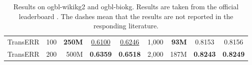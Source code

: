 \documentclass[10pt, a4paper]{article}
\begin{document}
\begin{table}[!htb]
{\begin{tabular}{ccrcccrcc}
			TransERR  & 100                                       & \textbf{250M}                                 & \underline{0.6100} & \underline{0.6246} & 1,000  & \textbf{93M}   & 0.8153             & 0.8156             \\
			TransERR  & 200                                       & 500M                                 & \textbf{0.6359}    & \textbf{0.6518}    & 2,000  & 187M  & \textbf{0.8243}    & \textbf{0.8249}    \\ \hline
		\end{tabular}}
	\caption{Results on ogbl-wikikg2 and ogbl-biokg. Results are taken from the official leaderboard \cite{hu2020open}. The dashes mean that the results are not reported in the responding literature.}
	\label{tab:ogbl}
\end{table}
\end{document}
